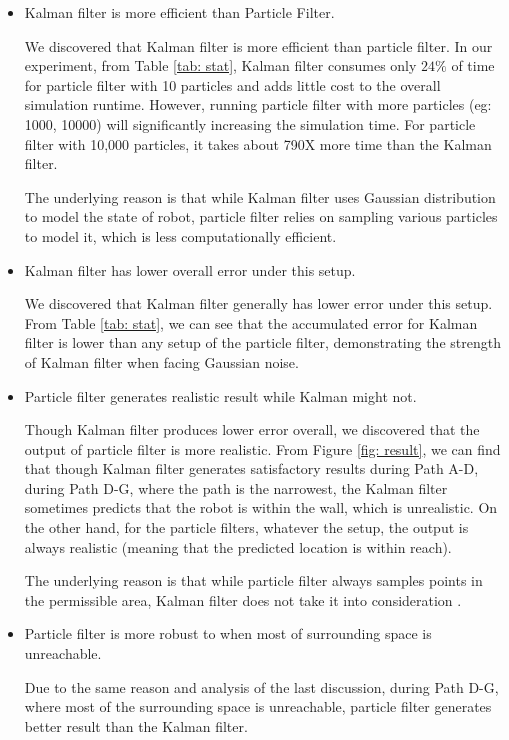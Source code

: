 \documentclass[conference,onecolumn]{IEEEtran}
\begin{document}
\begin{itemize}
    \item Kalman filter is more efficient than Particle Filter.
    
    
    We discovered that Kalman filter is more efficient than particle filter. In our experiment, from Table \ref{tab: stat}, Kalman filter consumes only $24\%$ of time for particle filter with 10 particles and adds little cost to the overall simulation runtime. However, running particle filter with more particles (eg: 1000, 10000) will significantly increasing the simulation time. For particle filter with 10,000 particles, it takes about 790X more time than the Kalman filter. 
    
    The underlying reason is that while Kalman filter uses Gaussian distribution to model the state of robot, particle filter relies on sampling various particles to model it, which is less computationally efficient.
    
   \item Kalman filter has lower overall error under this setup.
   
    We discovered that Kalman filter generally has lower error under this setup. From Table \ref{tab: stat}, we can see that the accumulated error for Kalman filter is lower than any setup of the particle filter, demonstrating the strength of Kalman filter when facing Gaussian noise.
    
    \item Particle filter generates realistic result while Kalman might not.
    
    Though Kalman filter produces lower error overall, we discovered that the output of particle filter is more realistic. From Figure \ref{fig: result}, we can find that though Kalman filter generates satisfactory results during Path A-D, during Path D-G, where the path is the narrowest, the Kalman filter sometimes predicts that the robot is within the wall, which is unrealistic. On the other hand, for the particle filters, whatever the setup, the output is always realistic (meaning that the predicted location is within reach).
    
    The underlying reason is that while particle filter always samples points in the permissible area, Kalman filter does not take it into consideration .
    
    \item Particle filter is more robust to when most of surrounding space is unreachable.
    
    Due to the same reason and analysis of the last discussion, during Path D-G, where most of the surrounding space is unreachable, particle filter generates better result than the Kalman filter.
     
\end{itemize}
\end{document}
